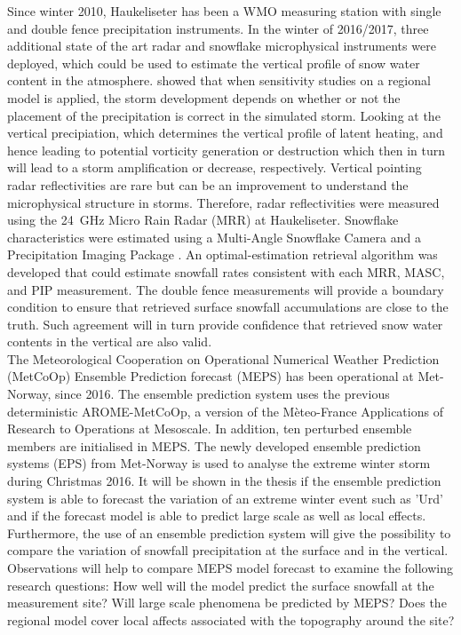 Since winter 2010, Haukeliseter has been a WMO measuring station with single and double fence precipitation instruments. In the winter of 2016/2017, three additional state of the art radar and snowflake microphysical instruments were deployed, which could be used to estimate the vertical profile of snow water content in the atmosphere. \citet{joos_influence_2012} showed that when sensitivity studies on a regional model is applied, the storm development depends on whether or not the placement of the precipitation is correct in the simulated storm. Looking at the vertical precipiation, which determines the vertical profile of latent heating, and hence leading to potential vorticity generation or destruction which then in turn will lead to a storm amplification or decrease, respectively. Vertical pointing radar reflectivities are rare but can be an improvement to understand the microphysical structure in storms. Therefore, radar reflectivities were measured using the \SI{24}{\giga\hertz} Micro Rain Radar (MRR) at Haukeliseter. Snowflake characteristics were estimated using a Multi-Angle Snowflake Camera \citep[MASC;][]{garrett_fall_2012} and a Precipitation Imaging Package \citep[PIP;][]{newman_presenting_2009}. 
An optimal-estimation retrieval algorithm was developed that could estimate  snowfall rates consistent with each MRR, MASC, and PIP measurement.  
The double fence measurements %
will provide a boundary condition to ensure that retrieved surface snowfall accumulations are close to the truth. Such agreement will in turn provide confidence that retrieved snow water contents in the vertical are also valid.
\\
The Meteorological Cooperation on Operational Numerical Weather Prediction (MetCoOp) Ensemble Prediction forecast (MEPS) has been operational at Met-Norway, since 2016. The ensemble prediction system uses the previous deterministic AROME-MetCoOp, a version of the Mèteo-France Applications of Research to Operations at Mesoscale. In addition, ten perturbed ensemble members are initialised in MEPS. The newly developed ensemble prediction systems (EPS) from Met-Norway is used to analyse the extreme winter storm during Christmas 2016. It will be shown in the thesis if the ensemble prediction system is able to forecast the variation of an extreme winter event such as 'Urd' and if the forecast model is able to predict large scale as well as local effects. Furthermore, the use of an ensemble prediction system will give the possibility to compare the variation of snowfall precipitation at the surface and in the vertical. Observations will help to compare MEPS model forecast to examine the following research questions: 
How well will the model predict the surface snowfall at the measurement site? Will large scale phenomena be predicted by MEPS?
Does the regional model cover local affects associated with the topography around the site?


